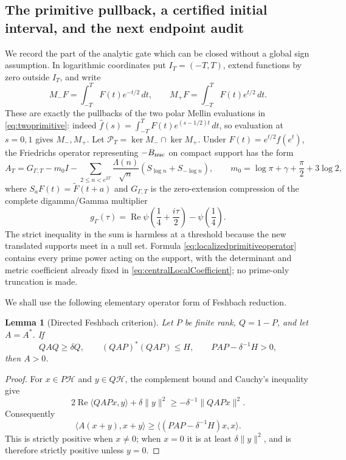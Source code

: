 \documentclass[11pt]{amsart}
\newtheorem{lemma}[theorem]{Lemma}
\theoremstyle{definition}
\theoremstyle{remark}
\begin{document}
\subsection{The primitive pullback, a certified initial interval, and the next endpoint audit}
\label{subsec:primitiveendpoints}

We record the part of the analytic gate which can be closed without a
global sign assumption.  In logarithmic coordinates put
\(I_T=(-T,T)\), extend functions by zero outside \(I_T\), and write
\[
 M_-F=\int_{-T}^{T}F(t)e^{-t/2}\,dt,
 \qquad
 M_+F=\int_{-T}^{T}F(t)e^{t/2}\,dt .
\]
These are exactly the pullbacks of the two polar Mellin evaluations in
\eqref{eq:twoprimitive}: indeed
\(\widehat f(s)=\int_{-T}^TF(t)e^{(s-1/2)t}\,dt\), so evaluation at
\(s=0,1\) gives \(M_-,M_+\).  Let
\(\mathcal P_T=\ker M_-\cap\ker M_+\).  Under
\(F(t)=e^{t/2}f(e^t)\), the Friedrichs operator representing
\(-B_{\rm nuc}\) on compact support has the form
\begin{equation}\label{eq:localizedprimitiveoperator}
 A_T=G_{\Gamma,T}-m_0I-
 \sum_{2\le n<e^{2T}}\frac{\Lambda(n)}{\sqrt n}
       (S_{\log n}+S_{-\log n}),
 \qquad
 m_0=\log\pi+\gamma+\frac{\pi}{2}+3\log2,
\end{equation}
where \(S_aF(t)=\widetilde F(t+a)\) and \(G_{\Gamma,T}\) is the
zero-extension compression of the complete digamma/Gamma multiplier
\[
 g_\Gamma(\tau)=\operatorname {Re}\psi
       \left(\frac14+\frac{i\tau}{2}\right)-\psi\left(\frac14\right).
\]
The strict inequality in the sum is harmless at a threshold because the
new translated supports meet in a null set.  Formula
\eqref{eq:localizedprimitiveoperator} contains every prime power acting on
the support, with the determinant and metric coefficient already fixed in
\eqref{eq:centralLocalCoefficient}; no prime-only truncation is made.

We shall use the following elementary operator form of Feshbach reduction.

\begin{lemma}[Directed Feshbach criterion]\label{lem:directedFeshbach}
Let \(P\) be finite rank, \(Q=1-P\), and let \(A=A^*\).  If
\begin{equation}\label{eq:directedFeshbachHypotheses}
 QAQ\ge\delta Q,\qquad
 (QAP)^*(QAP)\le H,\qquad
 PAP-\delta^{-1}H>0,
\end{equation}
then \(A>0\).
\end{lemma}

\begin{proof}
For \(x\in P\mathcal H\) and \(y\in Q\mathcal H\), the complement bound
and Cauchy's inequality give
\[
 2\operatorname{Re}\langle QAPx,y\rangle+\delta\|y\|^2
 \ge-\delta^{-1}\|QAPx\|^2.
\]
Consequently
\[
 \langle A(x+y),x+y\rangle
 \ge \langle(PAP-\delta^{-1}H)x,x\rangle.
\]
This is strictly positive when \(x\ne0\); when \(x=0\) it is at least
\(\delta\|y\|^2\), and is therefore strictly positive unless \(y=0\).
\end{proof}
\end{document}
